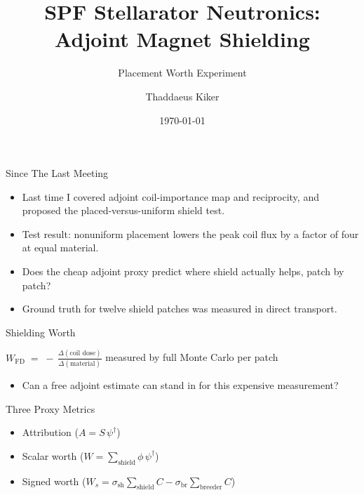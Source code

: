 \documentclass[aspectratio=169]{beamer}
\title{SPF Stellarator Neutronics: Adjoint Magnet Shielding}
\subtitle{Placement Worth Experiment}
\author{Thaddaeus Kiker}
\date{\today}
\newcommand{\kb}[1]{\begin{tcolorbox}[colback=key!5,colframe=key!60,boxsep=2pt,left=4pt,right=4pt,top=3pt,bottom=3pt]#1\end{tcolorbox}}
\begin{document}
\begin{frame}[plain]\titlepage\end{frame}

\begin{frame}{Since The Last Meeting}
  \begin{itemize}
    \item Last time I covered adjoint coil-importance map and reciprocity, and proposed the placed-versus-uniform shield test. 
    \item Test result: nonuniform placement lowers the peak coil flux by a factor of four at equal material.
    \item Does the cheap adjoint proxy predict where shield actually helps, patch by patch?
    \item Ground truth for twelve shield patches was measured in direct transport.
  \end{itemize}
\end{frame}

\begin{frame}{Shielding Worth}
  \kb{\centering $\displaystyle W_{\mathrm{FD}} \;=\; -\,\frac{\Delta(\text{coil dose})}{\Delta(\text{material})}$ \quad measured by full Monte Carlo per patch}
  \vspace{0.4em}
  \begin{itemize}
    \item Can a free adjoint estimate can stand in for this expensive measurement?
  \end{itemize}
\end{frame}

\begin{frame}{Three Proxy Metrics}
  \begin{itemize}
    \item Attribution ($A = S\,\psi^\dagger$)%
    \item Scalar worth ($W = \sum_{\mathrm{shield}} \phi\,\psi^\dagger$)%
    \item Signed worth ($W_s = \sigma_{\mathrm{sh}}\sum_{\mathrm{shield}} C - \sigma_{\mathrm{br}}\sum_{\mathrm{breeder}} C$)%
  \end{itemize}
\end{frame}
\end{document}
